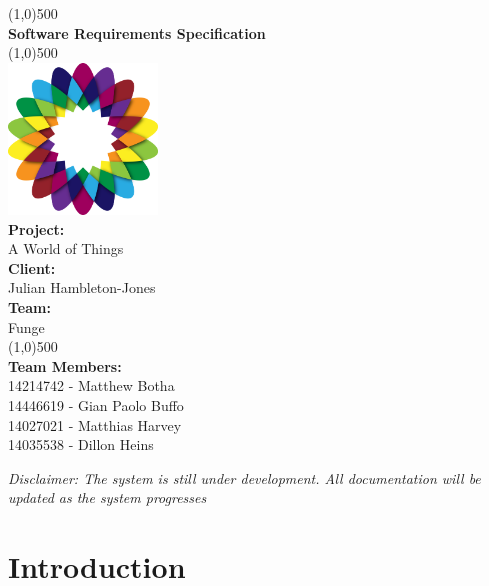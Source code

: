 \documentclass{article}
\let\cleardoublepage\clearpage
\begin{document}
	
	\begin{titlepage}
		\begin{center}
			\line(1,0){500}\\
			[6mm]
			\huge{\bfseries Software Requirements Specification}\\
			\line(1,0){500}\\
			[5mm]
			\includegraphics[width=150px]{../images/AWorldOfPlants.png}
			\\
			[5mm]
			\large\textbf{Project:}\\A World of Things\\
			[3mm]
			\large\textbf{Client:}\\Julian Hambleton-Jones\\
			[3mm]
			\large \textbf{Team:}\\Funge\\
			\line(1,0){500}\\
			[5mm]
			\large \textbf{Team Members:}\\
			[3mm]
			\large 14214742 - Matthew Botha\\
			\large 14446619 - Gian Paolo Buffo\\
			\large 14027021 - Matthias Harvey\\
			\large 14035538 - Dillon Heins\\[3mm]
		\end{center}
	\end{titlepage}
	
	\cleardoublepage
	\thispagestyle{empty}
	\tableofcontents
	\cleardoublepage
	\setcounter{page}{1}
	
	\textit{Disclaimer: The system is still under development. All documentation will be updated as the system progresses}

\section{Introduction}
\end{document}
